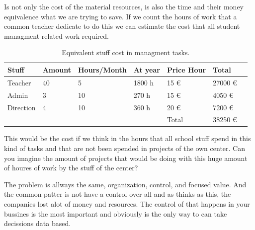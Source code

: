 Is not only the cost of the material resources, is also the time and their money
equivalence what we are trying to save.  If we count the hours of work that a
common teacher dedicate to do this we can estimate the cost that all student
managment related work required.

\begin{table}[H]
\centering

\begin{tabular}{@{}lllllll@{}}

Stuff & Amount & Hours/Month & At year & Price Hour & Total  \\
\midrule

Teacher     & 40 & 5    & 1800 h   & 15 \euro  & 27000  \euro  \\
Admin       & 3  & 10   & 270 h   & 15 \euro  & 4050   \euro  \\
Direction   & 4  & 10   & 360 h   & 20 \euro  & 7200   \euro  \\

\midrule
& & & & Total & 38250 \euro \\
\end{tabular}
\caption{Equivalent stuff cost in managment tasks. }
\label{my-label}
\end{table}

This would be the cost if we think in the hours that all school stuff spend
in this kind of tasks and that are not been spended in projects of the own
center.
Can you imagine the amount of projects that would be doing with this huge
amount of houres of work by the stuff of the center?

The problem is allways the same, organization, control, and focused value. And
the common patter is not have a control over all and as thinks as this, the
companies lost alot of money and resources. The control of that happens in your
bussines is the most important and obviously is the only way to can take
decissions data based.

